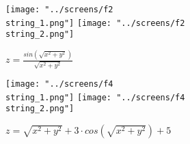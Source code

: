 \documentclass[oneside,final,14pt]{extreport}
\begin{document}
\begin{figure}[ht]
    \texttt{[image: "../screens/f2\\string\_1.png"]}
    \endminipage\hfill
    \texttt{[image: "../screens/f2\\string\_2.png"]}
    \endminipage\hfill
    \caption{\(z=\frac{sin\left(\sqrt{x^2 + y^2}\right)}{\sqrt{x^2 + y^2}}\)}
    \label{gui:2}
\end{figure}

\begin{figure}[ht]
    \texttt{[image: "../screens/f4\\string\_1.png"]}
    \endminipage\hfill
    \texttt{[image: "../screens/f4\\string\_2.png"]}
    \endminipage\hfill
    \caption{\(z=\sqrt{x^2 + y^2} + 3 \cdot cos\left(\sqrt{x^2 + y^2}\right)+5\)}
    \label{gui:3}
\end{figure}
\end{document}
